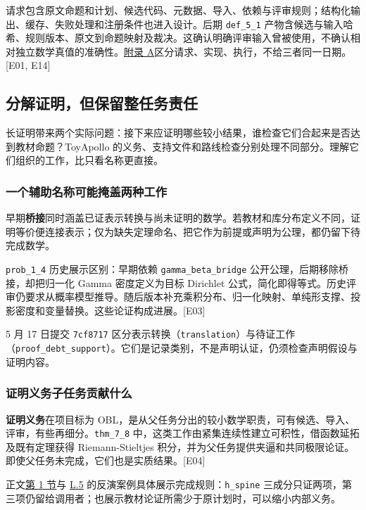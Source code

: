 请求包含原文命题和计划、候选代码、元数据、导入、依赖与评审规则；结构化输出、缓存、失败处理和注册条件也进入设计。后期 \nolinkurl{def_5_1} 产物含候选与输入哈希、规则版本、原文到命题映射及裁决。这确认明确评审输入曾被使用，不确认相对独立数学真值的准确性。\hyperlink{appendix-a}{附录 A}区分请求、实现、执行，不给三者同一日期。[E01, E14]

\subsection[分解证明，但保留整任务责任]{\texorpdfstring{\protect\hypertarget{l2}{}分解证明，但保留整任务责任}{分解证明，但保留整任务责任}}
长证明带来两个实际问题：接下来应证明哪些较小结果，谁检查它们合起来是否达到教材命题？ToyApollo 的义务、支持文件和路线检查分别处理不同部分。理解它们组织的工作，比只看名称更直接。

\subsubsection[一个辅助名称可能掩盖两种工作]{\texorpdfstring{\protect\hypertarget{l2-1}{}一个辅助名称可能掩盖两种工作}{一个辅助名称可能掩盖两种工作}}
早期\textbf{桥接}同时涵盖已证表示转换与尚未证明的数学。若教材和库分布定义不同，证明等价便连接表示；仅为缺失定理命名、把它作为前提或声明为公理，都仍留下待完成数学。

\nolinkurl{prob_1_4} 历史展示区别：早期依赖 \nolinkurl{gamma_beta_bridge} 公开公理，后期移除桥接，却把归一化 Gamma 密度定义为目标 Dirichlet 公式，简化即得等式。历史评审仍要求从概率模型推导。随后版本补充乘积分布、归一化映射、单纯形支撑、投影密度和变量替换。这些论证构成进展。[E03]

5 月 17 日提交 \nolinkurl{7cf8717} 区分表示转换（\nolinkurl{translation}）与待证工作（\nolinkurl{proof_debt_support}）。它们是记录类别，不是声明认证，仍须检查声明假设与证明内容。

\subsubsection[证明义务子任务贡献什么]{\texorpdfstring{\protect\hypertarget{l2-2}{}证明义务子任务贡献什么}{证明义务子任务贡献什么}}
\textbf{证明义务}在项目标为 OBL，是从父任务分出的较小数学职责，可有候选、导入、评审，有些再细分。\nolinkurl{thm_7_8} 中，这类工作由紧集连续性建立可积性，借函数延拓及既有定理获得 Riemann-Stieltjes 积分，并为父任务提供夹逼和共同极限论证。即使父任务未完成，它们也是实质结果。[E04]

正文\href{zh.pdf\#section-1}{第 1 节}与 \hyperlink{l5}{L.5} 的反演案例具体展示完成规则：\nolinkurl{h_spine} 三成分只证两项，第三项仍留给调用者；也展示教材论证所需少于原计划时，可以缩小内部义务。

